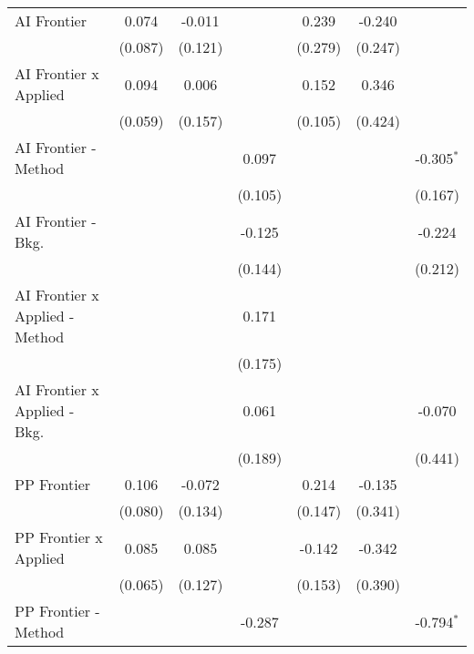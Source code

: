 \begin{tabular}{lcccccc}
   AI Frontier                    & 0.074         & -0.011  &         & 0.239         & -0.240        &   \\   
                                  & (0.087)       & (0.121) &         & (0.279)       & (0.247)       &   \\   
   AI Frontier x Applied          & 0.094         & 0.006   &         & 0.152         & 0.346         &   \\   
                                  & (0.059)       & (0.157) &         & (0.105)       & (0.424)       &   \\   
   AI Frontier - Method           &               &         & 0.097   &               &               & -0.305$^{*}$\\   
                                  &               &         & (0.105) &               &               & (0.167)\\   
   AI Frontier - Bkg.             &               &         & -0.125  &               &               & -0.224\\   
                                  &               &         & (0.144) &               &               & (0.212)\\   
   AI Frontier x Applied - Method &               &         & 0.171   &               &               &   \\   
                                  &               &         & (0.175) &               &               &   \\   
   AI Frontier x Applied - Bkg.   &               &         & 0.061   &               &               & -0.070\\   
                                  &               &         & (0.189) &               &               & (0.441)\\   
   PP Frontier                    & 0.106         & -0.072  &         & 0.214         & -0.135        &   \\   
                                  & (0.080)       & (0.134) &         & (0.147)       & (0.341)       &   \\   
   PP Frontier x Applied          & 0.085         & 0.085   &         & -0.142        & -0.342        &   \\   
                                  & (0.065)       & (0.127) &         & (0.153)       & (0.390)       &   \\   
   PP Frontier - Method           &               &         & -0.287  &               &               & -0.794$^{*}$\\   

\end{tabular}

